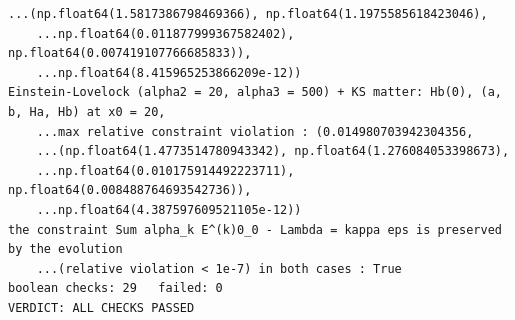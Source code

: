 \documentclass[10pt,a4paper]{article}
\begin{document}
\begin{Verbatim}[fontsize=\small,frame=single,framesep=2mm]
    ...(np.float64(1.5817386798469366), np.float64(1.1975585618423046),
    ...np.float64(0.011877999367582402), np.float64(0.007419107766685833)),
    ...np.float64(8.415965253866209e-12))
Einstein-Lovelock (alpha2 = 20, alpha3 = 500) + KS matter: Hb(0), (a, b, Ha, Hb) at x0 = 20,
    ...max relative constraint violation : (0.014980703942304356,
    ...(np.float64(1.4773514780943342), np.float64(1.276084053398673),
    ...np.float64(0.010175914492223711), np.float64(0.008488764693542736)),
    ...np.float64(4.387597609521105e-12))
the constraint Sum alpha_k E^(k)0_0 - Lambda = kappa eps is preserved by the evolution
    ...(relative violation < 1e-7) in both cases : True
boolean checks: 29   failed: 0
VERDICT: ALL CHECKS PASSED
\end{Verbatim}
\end{document}
